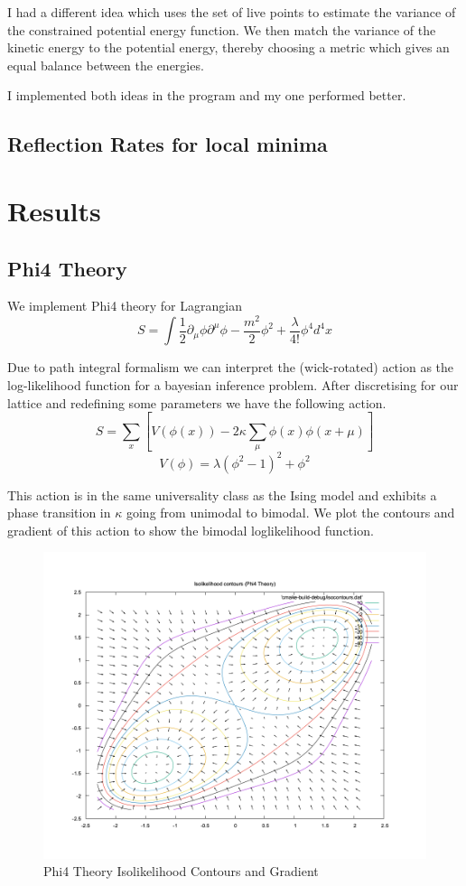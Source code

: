 \documentclass[11pt]{article}
\begin{document}
    I had a different idea which uses the set of live points to estimate the variance of the constrained
    potential energy function.
    We then match the variance of the kinetic energy to the potential energy, thereby
    choosing a metric which gives an equal balance between the energies.

    I implemented both ideas in the program and my one performed better.

    \subsection{Reflection Rates for local minima}

    \newpage
    \section{Results}
    \subsection{Phi4 Theory}
    We implement Phi4 theory for Lagrangian
    \[
        S = \int{\frac{1}{2} \partial_{\mu} \phi \partial^{\mu} \phi
    -\frac{m^2}{2} \phi^2  + \frac{\lambda}{4!} \phi^4 d^4x}
    \]

    Due to path integral formalism we can interpret the (wick-rotated) action as the log-likelihood function
    for a bayesian inference problem.
    After discretising for our lattice and redefining some parameters we have the following action.
    \[
        S = \sum_{x}\left[ V(\phi(x)) - 2\kappa \sum_{\mu}{\phi(x)\phi(x+\mu)} \right]
    \]
    \[
        V(\phi) = \lambda (\phi^2 - 1)^2 + \phi^2
    \]

    This action is in the same universality class as the Ising model and exhibits a phase transition
    in $\kappa$ going from unimodal to bimodal. We plot the contours and gradient of this action
    to show the bimodal loglikelihood function.


    \begin{figure}[H]
        \centering
        \includegraphics[width=0.75\linewidth]{../figures/phi4_isocontours}
        \caption{Phi4 Theory Isolikelihood Contours and Gradient}
        \label{fig:phi4contour}
    \end{figure}
\end{document}
